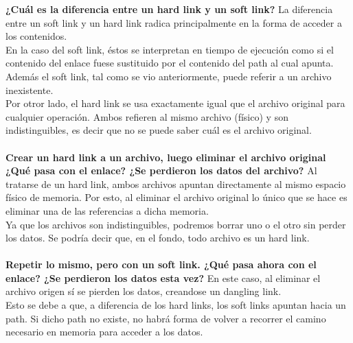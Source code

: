 \documentclass[a4paper, 12pt]{article}
\begin{document}
		\textbf{¿Cuál es la diferencia entre un hard link y un soft link?} La diferencia entre un soft link y un hard link radica principalmente en la forma de acceder a los contenidos.\\
		En la caso del soft link, éstos se interpretan en tiempo de ejecución como si el contenido del enlace fuese sustituido por el contenido del path al cual apunta. Además el soft link, tal como se vio anteriormente, puede referir a un archivo inexistente. \\
		Por otror lado, el hard link se usa exactamente igual que el archivo original para cualquier operación. Ambos refieren al mismo archivo (físico) y son indistinguibles, es decir que no se puede saber cuál es el archivo original.
		\\ 
		\\		
		\textbf{Crear un hard link a un archivo, luego eliminar el archivo original ¿Qué pasa con el enlace? ¿Se perdieron los datos del archivo?} Al tratarse de un hard link, ambos archivos apuntan directamente al mismo espacio físico de memoria. Por esto, al eliminar el archivo original lo único que se hace es eliminar una de las referencias a dicha memoria.\\ 
		Ya que los archivos son indistinguibles, podremos borrar uno o el otro sin perder los datos. Se podría decir que, en el fondo, todo archivo es un hard link.
		\\ 
		\\	
		\textbf{Repetir lo mismo, pero con un soft link. ¿Qué pasa ahora con el enlace? ¿Se perdieron los datos esta vez?} En este caso, al eliminar el archivo origen sí se pierden los datos, creandose un dangling link.\\
		Esto se debe a que, a diferencia de los hard links, los soft links apuntan hacia un path. Si dicho path no existe, no habrá forma de volver a recorrer el camino necesario en memoria para acceder a los datos.
			
\end{document}
